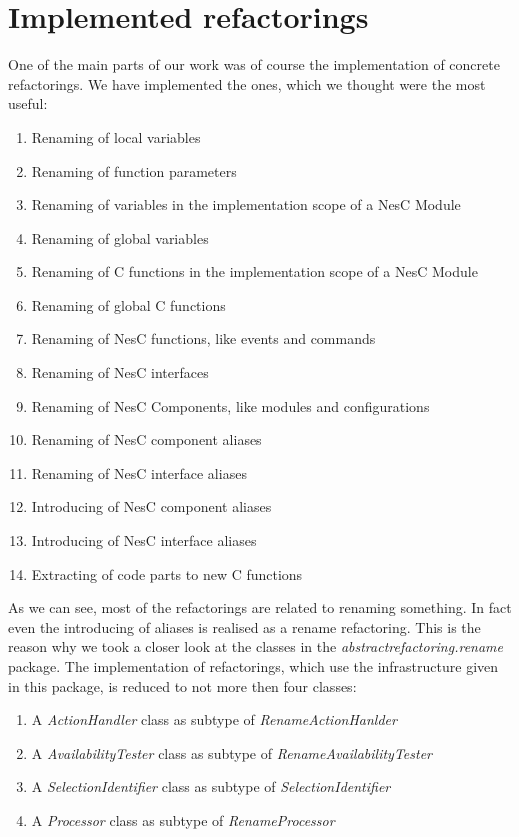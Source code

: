 \documentclass[a4paper,10pt]{report}
\begin{document}
\section{Implemented refactorings}
One of the main parts of our work was of course the implementation of concrete refactorings.
We have implemented the ones, which we thought were the most useful:
   \begin{enumerate}
     \item Renaming of local variables
     \item Renaming of function parameters
     \item Renaming of variables in the implementation scope of a NesC Module
     \item Renaming of global variables
     \item Renaming of C functions in the implementation scope of a NesC Module 
     \item Renaming of global C functions
     \item Renaming of NesC functions, like events and commands
     \item Renaming of NesC interfaces
     \item Renaming of NesC Components, like modules and configurations
     \item Renaming of NesC component aliases
     \item Renaming of NesC interface aliases
     \item Introducing of NesC component aliases
     \item Introducing of NesC interface aliases
     \item Extracting of code parts to new C functions
   \end{enumerate}
As we can see, most of the refactorings are related to renaming something. In fact even the introducing of aliases is realised as a rename refactoring.
This is the reason why we took a closer look at the classes in the {\it abstractrefactoring.rename} package. 
The implementation of refactorings, which use the infrastructure given in this package, is reduced to not more then four classes:
   \begin{enumerate}
     \item A {\it ActionHandler} class as subtype of {\it RenameActionHanlder}
     \item A {\it AvailabilityTester} class as subtype of {\it RenameAvailabilityTester}
     \item A {\it SelectionIdentifier} class as subtype of {\it SelectionIdentifier}
     \item A {\it Processor} class as subtype of {\it RenameProcessor}
   \end{enumerate}
\end{document}
